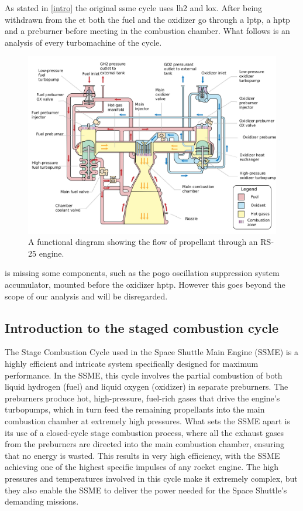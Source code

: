 As stated in \cref{intro} the original \acrshort{ssme} cycle uses \acrlong{lh2} and \acrlong{lox}. After being withdrawn from the \acrfull{et} both the fuel and the oxidizer go through a \acrfull{lptp}, a \acrfull{hptp} and a preburner before meeting in the combustion chamber. What follows is an analysis of every turbomachine of the cycle.
\begin{figure}
	\centering
 \includegraphics[width=.75\textwidth]{ssme_ciclo}
	\caption{A functional diagram showing the flow of propellant through an RS-25 engine.}
	\label{fig:ssme_cycle}
\end{figure}
 is missing some components, such as the pogo oscillation suppression system accumulator, mounted before the oxidizer \acrshort{hptp}. However this goes beyond the scope of our analysis and will be disregarded.

\subsection{Introduction to the staged combustion cycle}
The Stage Combustion Cycle used in the Space Shuttle Main Engine (SSME) is a highly efficient and intricate system specifically designed for maximum performance.
In the SSME, this cycle involves the partial combustion of both liquid hydrogen (fuel) and liquid oxygen (oxidizer) in separate preburners. 
The preburners produce hot, high-pressure, fuel-rich gases that drive the engine's turbopumps, which in turn feed the remaining propellants into the main combustion chamber at extremely high pressures.
What sets the SSME apart is its use of a closed-cycle stage combustion process, where all the exhaust gases from the preburners are directed into the main combustion chamber, ensuring that no energy is wasted.
This results in very high efficiency, with the SSME achieving one of the highest specific impulses of any rocket engine.
The high pressures and temperatures involved in this cycle make it extremely complex, but they also enable the SSME to deliver the power needed for the Space Shuttle's demanding missions.

